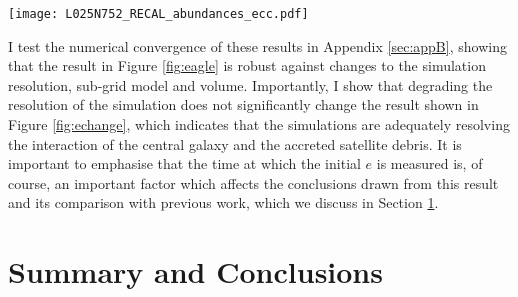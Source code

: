 \begin{figure*}
\texttt{[image: L025N752\_RECAL\_abundances\_ecc.pdf]}

\caption[The \mgfe{}-\feh{} abundances of the satellites accreted onto Milky Way mass haloes in the Recal-L025N0752 simulation of the EAGLE suite]{\label{fig:eagleabundances} Mean \mgfe{} and \feh{} of the
accreted satellites shown in Figures \ref{fig:eagle} and
\ref{fig:echange}. In both panels, point size and filling
indicate the number of particles of accreted systems, and morphology
of central galaxy, respectively, as in previous figures.  On the
right hand panel, colour denotes the masses of accreted satellites.
The same data are shown in the left hand panel, colour-coded by the
median eccentricity at $z=0$ of the debris.  The dashed and dotted
lines indicate roughly the locus of the disk stars of
MW-like central galaxies in the L025N752-Recal simulation \citep[see,
e.g.][]{2018MNRAS.477.5072M}. It is clear that the abundances of the stars in
the accreted satellites are roughly consistent with those seen in
halo stars in the APOGEE data (the median and 1$\sigma$ scatter of
the high $e$ group is shown by the black error bars).  Less massive
satellites have a large spread in \mgfe, but all have lower \feh{}
than the more massive satellites.  The increasing \feh{} with
satellite mass is very clear. The left hand panel shows that there
is a distinct lack of high eccentricity satellite debris at high
\mgfe{} and low \feh{}, such that, in general, high $e$ debris
occupies a similar locus to that of the high $e$ group in the
observed data.}

\end{figure*}

I test the numerical convergence of these results in Appendix
\ref{sec:appB}, showing that the result in Figure \ref{fig:eagle}
is robust against changes to the simulation resolution, sub-grid
model and volume. Importantly, I show that degrading the resolution
of the simulation does not significantly change the result shown
in Figure \ref{fig:echange}, which indicates that the simulations
are adequately resolving the interaction of the central galaxy and
the accreted satellite debris. It is important to emphasise that
the time at which the initial $e$ is measured is, of course, an
important factor which affects the conclusions drawn from this
result and its comparison with previous work, which we discuss 
in Section \ref{finale}.


\section{Summary and Conclusions} \label{finale}


